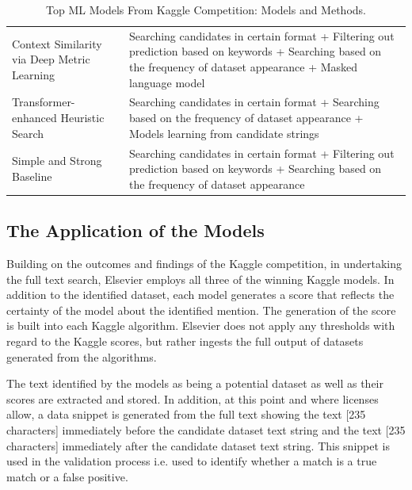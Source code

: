 \documentclass[titlepage, 11pt]{article}
\begin{document}
{\begin{table}[h!]

{\renewcommand{\arraystretch}{1.5}%
\begin{tabularx}{1\textwidth} { 
  | >{\raggedright\arraybackslash}X
  | >{\raggedright\arraybackslash}X 
  |}
 \hline
 {\bf Model Name} &{\bf Methods Used}  \\
 \hline
 Context Similarity via Deep Metric Learning & Searching candidates in certain format + Filtering out prediction based on keywords + Searching based on the frequency of dataset appearance + Masked language model  \\
 \hline
 Transformer-enhanced Heuristic Search & Searching candidates in certain format + Searching based on the frequency of dataset appearance + Models learning from candidate strings  \\
 \hline
  Simple and Strong Baseline & Searching candidates in certain format + Filtering out prediction based on keywords + Searching based on the frequency of dataset appearance  \\
 \hline
 
\end{tabularx}
\caption{Top ML Models From Kaggle Competition: Models and Methods.}
\label{table:1}
}
\end{table}

\subsection{The Application of the Models}
Building on the outcomes and findings of the Kaggle competition, in undertaking the full text search, Elsevier employs all three of the winning Kaggle models. In addition to the identified dataset, each model generates a score that reflects the certainty of the model about the identified mention. The generation of the score is built into each Kaggle algorithm. Elsevier does not apply any thresholds with regard to the Kaggle scores, but rather ingests the full output of datasets generated from the algorithms.

The text identified by the models as being a potential dataset as well as their scores are extracted and stored. In addition, at this point and where licenses allow, a data snippet is generated from the full text showing the text [235 characters] immediately before the candidate dataset text string and the text [235 characters] immediately after the candidate dataset text string. This snippet is used in the validation process i.e. used to identify whether a match is a true match or a false positive.

}
\end{document}
